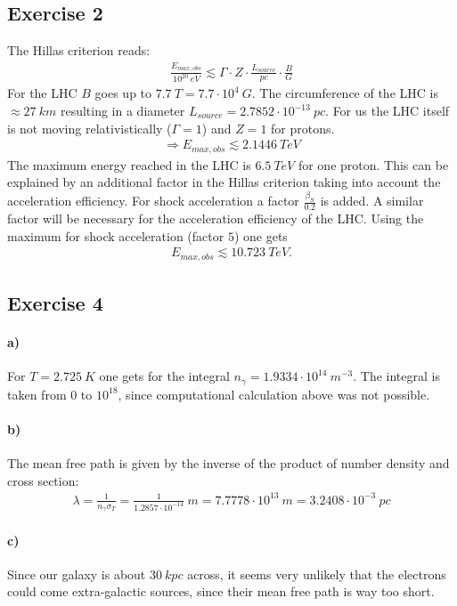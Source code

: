 \documentclass[10pt,a4paper]{article}
\begin{document}
\subsection*{Exercise 2}
The Hillas criterion reads:
\begin{align*}
\frac{E_{max, obs}}{10^{20}\ eV} \lesssim \Gamma \cdot Z \cdot \frac{L_{source}}{pc} \cdot \frac{B}{G}
\end{align*}
For the LHC $B$ goes up to $7.7\ T = 7.7\cdot 10^4\ G$. The circumference of the LHC is $\approx 27\ km$ resulting in a diameter $L_{source} = 2.7852 \cdot 10^{-13}\ pc$. For us the LHC itself is not moving relativistically ($\Gamma = 1$) and $Z = 1$ for protons.
\begin{align*}
\Rightarrow E_{max, obs} \lesssim 2.1446\ TeV
\end{align*}
The maximum energy reached in the LHC is $6.5\ TeV$ for one proton. This can be explained by an additional factor in the Hillas criterion taking into account the acceleration efficiency. For shock acceleration a factor $\frac{\beta_S}{0.2}$ is added. A similar factor will be necessary for the acceleration efficiency of the LHC. Using the maximum for shock acceleration (factor $5$) one gets
\begin{align*}
E_{max, obs} \lesssim 10.723\ TeV.
\end{align*}

\subsection*{Exercise 4}
\paragraph{a)}
For $T = 2.725\ K$ one gets for the integral $n_\gamma = 1.9334\cdot 10^14\ m^{-3}$. The integral is taken from 0 to $10^{18}$, since computational calculation above was not possible.

\paragraph{b)}
The mean free path is given by the inverse of the product of number density and cross section:
\begin{align*}
\lambda = \frac{1}{n_\gamma \sigma_T} = \frac{1}{1.2857 \cdot 10^{-14}}\ m = 7.7778 \cdot 10^{13}\ m = 3.2408 \cdot 10^{-3}\ pc
\end{align*}

\paragraph{c)}
Since our galaxy is about $30\ kpc$ across, it seems very unlikely that the electrons could come extra-galactic sources, since their mean free path is way too short.
\end{document}
